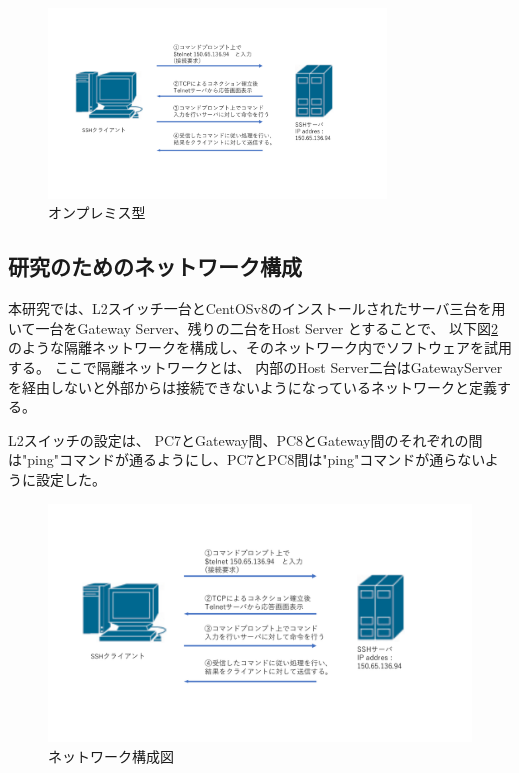 \documentclass[12pt,a4paper,titlepage]{jsarticle}
\begin{document}
\begin{figure}[h]
    \centering
    \includegraphics*[width=0.8\textwidth,page=15]{graphs/network_archtecture.pdf}
    \caption{オンプレミス型}
    \label{onpremise_graph}
\end{figure}



\subsection{研究のためのネットワーク構成}
本研究では、L2スイッチ一台とCentOSv8のインストールされたサーバ三台を用いて一台をGateway Server、残りの二台をHost Server
とすることで、
以下図\ref{network_graph}のような隔離ネットワークを構成し、そのネットワーク内でソフトウェアを試用する。
ここで隔離ネットワークとは、
内部のHost Server二台はGatewayServerを経由しないと外部からは接続できないようになっているネットワークと定義する。

L2スイッチの設定は、
PC7とGateway間、PC8とGateway間のそれぞれの間は"ping"コマンドが通るようにし、PC7とPC8間は"ping"コマンドが通らないように設定した。

\begin{figure}[H]
    \centering
    \includegraphics*[width=1.0\textwidth,page=2]{graphs/network_archtecture.pdf}
    \caption{ネットワーク構成図}
    \label{network_graph}
\end{figure}
\end{document}
